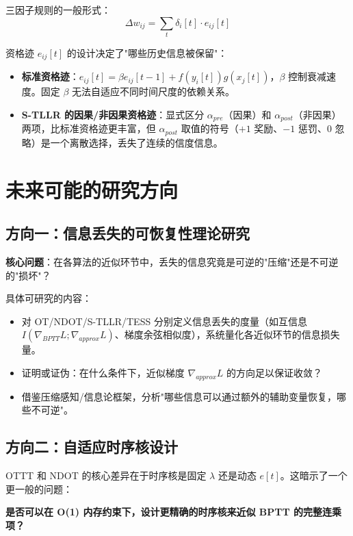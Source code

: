\documentclass[journal,12pt,onecolumn]{IEEEtran}
\begin{document}
三因子规则的一般形式：
\begin{equation}
\Delta w_{ij} = \sum_t \delta_i[t] \cdot e_{ij}[t]
\label{eq.threefactor}
\end{equation}

资格迹 $e_{ij}[t]$ 的设计决定了"哪些历史信息被保留"：
\begin{itemize}
    \item \textbf{标准资格迹}：$e_{ij}[t] = \beta e_{ij}[t-1] + f(y_i[t])g(x_j[t])$，$\beta$ 控制衰减速度。固定 $\beta$ 无法自适应不同时间尺度的依赖关系。
    \item \textbf{S-TLLR 的因果/非因果资格迹}：显式区分 $\alpha_{pre}$（因果）和 $\alpha_{post}$（非因果）两项，比标准资格迹更丰富，但 $\alpha_{post}$ 取值的符号（$+1$ 奖励、$-1$ 惩罚、$0$ 忽略）是一个离散选择，丢失了连续的信度信息。
\end{itemize}

\section{未来可能的研究方向}

\subsection{方向一：信息丢失的可恢复性理论研究}

\textbf{核心问题}：在各算法的近似环节中，丢失的信息究竟是可逆的"压缩"还是不可逆的"损坏"？

具体可研究的内容：
\begin{itemize}
    \item 对 OT/NDOT/S-TLLR/TESS 分别定义信息丢失的度量（如互信息 $I(\nabla_{BPTT}L; \nabla_{approx}L)$、梯度余弦相似度），系统量化各近似环节的信息损失量。
    \item 证明或证伪：在什么条件下，近似梯度 $\nabla_{approx}L$ 的方向足以保证收敛？
    \item 借鉴压缩感知/信息论框架，分析"哪些信息可以通过额外的辅助变量恢复，哪些不可逆"。
\end{itemize}

\subsection{方向二：自适应时序核设计}

OTTT 和 NDOT 的核心差异在于时序核是固定 $\lambda$ 还是动态 $e[t]$。这暗示了一个更一般的问题：

\textbf{是否可以在 O(1) 内存约束下，设计更精确的时序核来近似 BPTT 的完整连乘项？}
\end{document}
